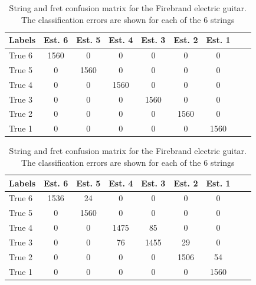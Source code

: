 \documentclass{article}
\begin{document}
\begin{table}\centering %
\caption{String and fret confusion matrix for the Martin  acoustic guitar. The classification errors are shown for each of the 6 strings.}
\label{tbl:string_confusion_martin}
\begin{tabularx}{0.46\textwidth}{@{}l*{7}{c}c@{}}
\toprule
Labels &Est. 6   &Est. 5 &Est. 4   &Est. 3   &Est. 2   &Est. 1   \\ 
\midrule
True 6   &1560 \cellcolor[gray]{.8} &0  &0  &0  &0  &0  \\  
True 5   &0  & 1560\cellcolor[gray]{.8} & 0   &0  &0  &0  \\
True 4   &0  &0  &1560 \cellcolor[gray]{.8} &0  &0  &0  \\  
True 3   &0  &0  &0  &1560 \cellcolor[gray]{.8} &0  &0  \\  
True 2   &0  &0  &0  &0  &1560 \cellcolor[gray]{.8} &0  \\  
True 1   &0  &0  &0  &0  &0  &1560 \cellcolor[gray]{.8} \\  
\bottomrule
\end{tabularx}
%
\vspace{6mm}
\caption{String and fret confusion matrix for the Firebrand electric guitar. The classification errors are shown for each of the 6 strings}
\label{tbl:str_confusion_firebrand}
\begin{tabularx}{0.46\textwidth}{@{}l*{7}{c}c@{}}
\toprule
Labels &Est. 6   &Est. 5 &Est. 4   &Est. 3   &Est. 2   &Est. 1   \\ 
\midrule
True 6   &1536 \cellcolor[gray]{.8}       & 24                        &0      &0  &0  &0 \\
True 5   &0  & 1560\cellcolor[gray]{.8}   & 0                        &0      &0  &0  \\
True 4   &0  &0  &1475 \cellcolor[gray]{.8}                           & 85   &0  &0  \\
True 3   &0  &0  &76                     &1455 \cellcolor[gray]{.8}   & 29   &0  \\
True 2   &0  &0  &0  &0                   &1506 \cellcolor[gray]{.8}  & 54  \\
True 1   &0  &0  &0  &0                   &0                          &1560 \cellcolor[gray]{.8} \\
\bottomrule %
\end{tabularx}
\end{table}
\end{document}
